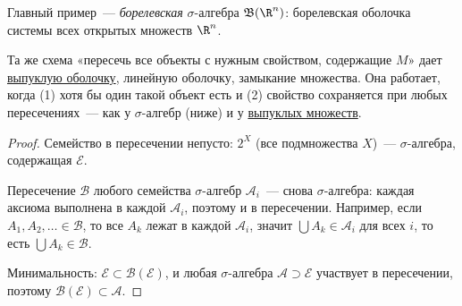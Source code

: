 

\begin{remark}
  Главный пример~--- \emph{борелевская} $\sigma$-алгебра $\mathfrak{B}(\R^n)$: борелевская оболочка системы всех открытых множеств $\R^n$.
\end{remark}

\begin{remark}
  Та же схема «пересечь все объекты с нужным свойством, содержащие $M$» дает \hyperref[note:1AC657F9-2A3D-47D1-A71D-5B813D961260]{выпуклую оболочку}, линейную оболочку, замыкание множества. Она работает, когда (1) хотя бы один такой объект есть и (2) свойство сохраняется при любых пересечениях~--- как у $\sigma$-алгебр (ниже) и у \hyperref[note:08CF7113-4709-4C4F-A0E7-4A2ED595BD7F]{выпуклых множеств}.
\end{remark}

\begin{proof}
  Семейство в пересечении непусто: $2^X$ (все подмножества $X$)~--- $\sigma$-алгебра, содержащая $\mathcal{E}$.

  Пересечение $\mathcal{B}$ любого семейства $\sigma$-алгебр $\mathcal{A}_i$~--- снова $\sigma$-алгебра: каждая аксиома выполнена в каждой $\mathcal{A}_i$, поэтому и в пересечении. Например, если $A_1, A_2, \dots \in \mathcal{B}$, то все $A_k$ лежат в каждой $\mathcal{A}_i$, значит $\bigcup A_k \in \mathcal{A}_i$ для всех $i$, то есть $\bigcup A_k \in \mathcal{B}$.

  Минимальность: $\mathcal{E} \subset \mathcal{B}(\mathcal{E})$, и любая $\sigma$-алгебра $\mathcal{A} \supset \mathcal{E}$ участвует в пересечении, поэтому $\mathcal{B}(\mathcal{E}) \subset \mathcal{A}$.
\end{proof}
